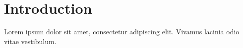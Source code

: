 \documentclass{article}
\begin{document}
\section{Introduction}
Lorem ipsum dolor sit amet, consectetur adipiscing elit. Vivamus lacinia odio vitae vestibulum.

\lipsum[1]
\end{document}
